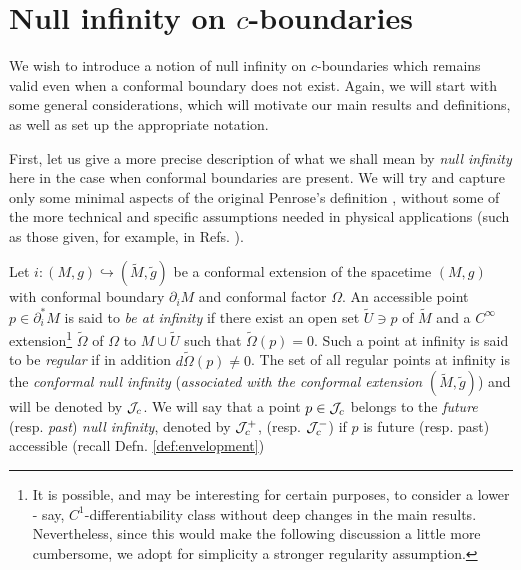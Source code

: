 \section{Null infinity on $c$-boundaries}\label{bh}

We wish to introduce a notion of null infinity on $c$-boundaries which remains valid even when a conformal boundary does not exist.
Again, we will start with some general considerations, which will motivate our main results and definitions, as well as set up the appropriate notation.

First, let us give a more precise description of what we shall mean by {\em null infinity} here in the case when conformal boundaries are present. We will try and capture only some minimal aspects of the original Penrose's definition \cite{PenroseAsymptoticStructure1963,PenroseConformalInfinity1964,Frauendiener2004}, without some of the more technical and specific assumptions needed in physical applications (such as those given, for example, in Refs. \cite{HawkingLargeScaleStructure1975,WaldGeneralRelativity1984}).

\begin{definition}
\label{conformalinfinity1}
Let $i: (M,g) \hookrightarrow (\tilde{M},\tilde{g})$ be a conformal extension of the spacetime $(M,g)$ with conformal boundary $\partial_i M$ and conformal factor $\Omega$. An accessible point $p \in \partial^{*}_i M$ is said to {\em be at infinity} if there exist an open set $\tilde{U} \ni p$ of $\tilde{M}$ and a $C^{\infty}$ extension\footnote{It is possible, and may be interesting for certain purposes, to consider a lower - say, $C^1$-differentiability class without deep changes in the main results. Nevertheless, since this would make the following discussion a little more cumbersome, we adopt for simplicity a stronger regularity assumption.} $\tilde{\Omega}$ of $\Omega$ to $M \cup \tilde{U}$ such that $\tilde{\Omega}(p) =0$. Such a point at infinity is said to be {\em regular} if in addition $d\tilde{\Omega}(p) \neq 0$. The set of all regular points at infinity is the {\em conformal null infinity} ({\em associated with the conformal extension} $(\tilde{M},\tilde{g})$) and will be denoted by ${\cal J}_c$. We will say that a point $p\in {\cal J}_c$ belongs to the {\em future} (resp. {\em past}) {\em null infinity}, denoted by ${\cal J}_c^+$, (resp. ${\cal J}_c^-$) if $p$ is future (resp. past) accessible (recall Defn. \ref{def:envelopment})
\end{definition}

